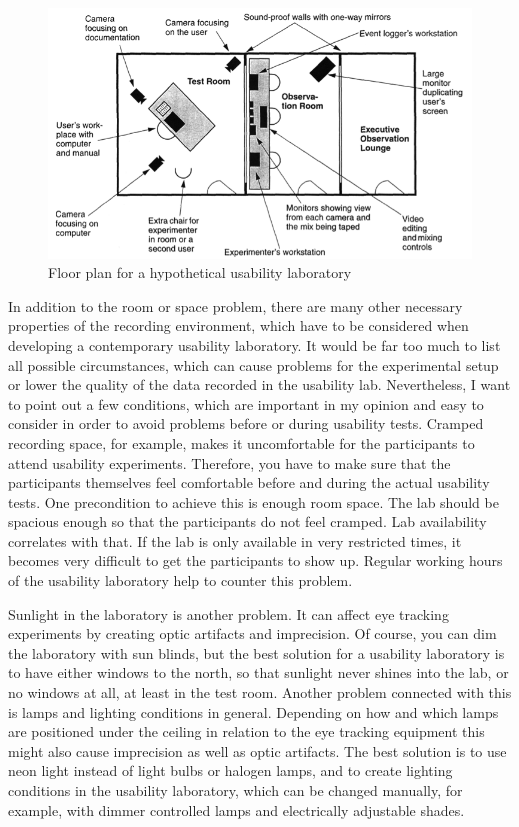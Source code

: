 \documentclass[output=paper]{langsci/langscibook}
\begin{document}
\begin{figure}
 \includegraphics[width=\textwidth]{figures/Roesener6.png}
 \caption{Floor plan for a hypothetical usability laboratory \citep[p. 201]{nielsen1993}}
 \label{roesener:fig:6}
\end{figure} 


In addition to the room or space problem, there are many other necessary properties of the recording environment, which have to be considered when developing a contemporary usability laboratory. It would be far too much to list all possible circumstances, which can cause problems for the experimental setup or lower the quality of the data recorded in the usability lab. Nevertheless, I want to point out a few conditions, which are important in my opinion and easy to consider in order to avoid problems before or during usability tests. Cramped recording space, for example, makes it uncomfortable for the participants to attend usability experiments. Therefore, you have to make sure that the participants themselves feel comfortable before and during the actual usability tests. One precondition to achieve this is enough room space. The lab should be spacious enough so that the participants do not feel cramped. Lab availability correlates with that. If the lab is only available in very restricted times, it becomes very difficult to get the participants to show up. Regular working hours of the usability laboratory help to counter this problem.


 Sunlight in the laboratory is another problem. It can affect eye tracking experiments by creating optic artifacts and imprecision. Of course, you can dim the laboratory with sun blinds, but the best solution for a usability laboratory is to have either windows to the north, so that sunlight never shines into the lab, or no windows at all, at least in the test room. Another problem connected with this is lamps and lighting conditions in general. Depending on how and which lamps are positioned under the ceiling in relation to the eye tracking equipment this might also cause imprecision as well as optic artifacts. The best solution is to use neon light instead of light bulbs or halogen lamps, and to create lighting conditions in the usability laboratory, which can be changed manually, for example, with dimmer controlled lamps and electrically adjustable shades.
\end{document}
